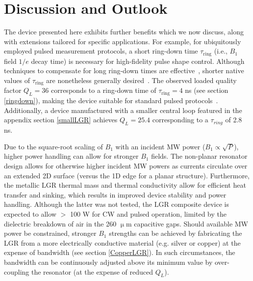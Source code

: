 
\chapter{Discussion and Outlook} \label{ch4}

The device presented here exhibits further benefits which we now discuss, along with extensions tailored for specific applications. For example, for ubiquitously employed pulsed measurement protocols, a short ring-down time $\tau_\text{ring}$ (i.e., $B_1$ field $1/e$ decay time) is necessary for high-fidelity pulse shape control. Although techniques to compensate for long ring-down times are effective~\cite{tabuchi2010total,borneman2012bandwidth,peshkovsky2005rf}, shorter native values of $\tau_\text{ring}$ are nonetheless generally desired~\cite{pfenninger1995general,rinard2005loopgap}. The observed loaded quality factor $Q_L = 36$ corresponds to a ring-down time of $\tau_\text{ring} = 4$ ns (see section \ref{ringdown}), making the device suitable for standard pulsed protocols~\cite{Smeltzer2009Quantum, Jelezko2004Observation}. Additionally, a device manufactured with a smaller central loop featured in the appendix section \ref{smallLGR} achieves $Q_L =25.4$ corresponding to a $\tau_{ring}$ of 2.8 ns.


Due to the square-root scaling of $B_1$ with an incident MW power ($B_1 \propto \sqrt{P}$), higher power handling can allow for stronger $B_1$ fields. The non-planar resonator design allows for otherwise higher incident MW powers as currents circulate over an extended 2D surface (versus the 1D edge for a planar structure). Furthermore, the metallic LGR thermal mass and  thermal conductivity allow for efficient heat transfer and sinking, which results in improved device stability and power handling. Although the latter was not tested, the LGR composite device is expected to allow $>\!$ 100 W for CW and pulsed operation, limited by the dielectric breakdown of air in the 260 $\upmu$m capacitive gaps. Should available MW power be constrained, stronger $B_1$ strengths can be achieved by fabricating the LGR from a more electrically conductive material (e.g. silver or copper) at the expense of bandwidth (see section \ref{CopperLGR}). In such circumstances, the bandwidth can be continuously adjusted above its minimum value by over-coupling the resonator (at the expense of reduced $Q_L$). 


